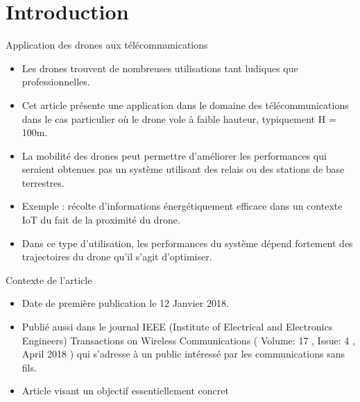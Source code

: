 

\section {Introduction}

\begin{frame}{Application des drones aux télécommunications}
\begin{itemize}
\item Les drones trouvent de nombreuses utilisations tant ludiques que professionnelles. 
\item Cet article présente une application dans le domaine des télécommunications dans le cas particulier où le drone vole à faible hauteur, typiquement H = 100m.
\item La mobilité des drones peut permettre d'améliorer les performances qui seraient obtenues pas un système
utilisant des relais ou des stations de base terrestres.
\item Exemple : récolte d'informations énergétiquement efficace dans un contexte IoT du fait de la proximité du drone.
\item Dans ce type d'utilisation, les performances du système dépend fortement des trajectoires du drone qu'il s'agit d'optimiser.
\end{itemize}
  

\end{frame}

\begin{frame}{Contexte de l'article}
\begin{itemize}
	
	\item Date de première publication le 12 Janvier 2018.
	
	\item Publié aussi dans le journal IEEE (Institute of Electrical and Electronics Engineers) Transactions on Wireless Communications 
	( Volume: 17 , Issue: 4 , April 2018 ) qui s'adresse à un public intéressé par les communications sans fils.
	
	\item Article visant un objectif essentiellement concret

	
\end{itemize}
\end{frame}

